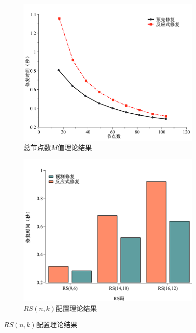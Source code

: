 \begin{figure}[htbp]
	\centering
	\begin{subfigure}[t]{0.4\textwidth}
		\centering
		\includegraphics[width=1.1\linewidth]{figures/3-1.pdf}
		\caption{总节点数$M$值理论结果}
		\label{fig:3-1}
	\end{subfigure}
	\begin{subfigure}[t]{0.4\textwidth}
		\centering
		\includegraphics[width=1.2\linewidth]{figures/3-2.pdf}
		\caption{$RS(n,k)$配置理论结果}
		\label{fig:3-2}
	\end{subfigure}

\end{figure}
